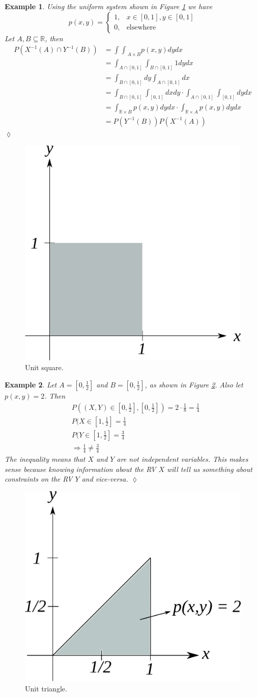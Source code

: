 \documentclass[lecture,12pt,]{pcms-l}
\theoremstyle{example}
\newtheorem{example}{Example}[section]
\begin{document}
\begin{example}
Using the uniform system shown in Figure \ref{fig:02unitSquare} we have
$$p(x,y) = \begin{cases} 1, & x\in[0,1],y\in[0,1] \\ 0, & \text{elsewhere} \end{cases}$$
Let $A,B\subseteq\mathbb{R}$, then
\begin{align*}
P(X^{-1}(A) \cap Y^{-1}(B)) &= {\int\int}_{A\times B} p(x,y)dydx \\
&= \int_{A\cap[0,1]}\int_{B\cap[0,1]} 1 dydx \\
&= \int_{B\cap[0,1]}dy \int_{A\cap[0,1]}dx \\
&= \int_{B\cap[0,1]}\int_{[0,1]}dxdy \cdot \int_{A\cap[0,1]}\int_{[0,1]}dydx \\
&= \int_{\mathbb{R}\times B}p(x,y)dydx \cdot \int_{\mathbb{R}\times A}p(x,y)dydx \\
&= P(Y^{-1}(B)) P(X^{-1}(A))
\end{align*}
$\lozenge$
\end{example}
\begin{figure}[ht!]
	\centering
	\includegraphics[width=.3\textwidth]{images/02unitSquare}
	\caption{Unit square.}
	\label{fig:02unitSquare}
\end{figure}

\begin{example}
Let $A=[0,\frac{1}{2}]$ and $B=[0,\frac{1}{2}]$, as shown in Figure \ref{fig:02unitTriangle}. Also let $p(x,y)=2$. Then
\begin{align*}
&P((X,Y)\in [0,\frac{1}{2}],[0,\frac{1}{2}]) = 2\cdot \frac{1}{8} = \frac{1}{4} \\
&P(X\in[1,\frac{1}{2}] = \frac{1}{4} \\
&P(Y\in[1,\frac{1}{2}] = \frac{3}{4} \\
&\Rightarrow \frac{1}{4} \neq \frac{3}{4}
\end{align*}
The inequality means that $X$ and $Y$ are not independent variables. This makes sense because knowing information about the RV $X$ will tell us something about constraints on the RV $Y$ and vice-versa.
$\lozenge$
\end{example}
\begin{figure}[ht!]
	\centering
	\includegraphics[width=.3\textwidth]{images/02unitTriangle}
	\caption{Unit triangle.}
	\label{fig:02unitTriangle}
\end{figure}
\end{document}
